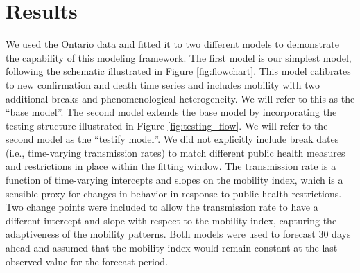 \documentclass[12pt]{article}\usepackage[]{graphicx}\usepackage[]{color}
\begin{document}
\FloatBarrier

\hypertarget{sec:Results}{}
\section{Results}

We used the Ontario data and fitted it to two different models to demonstrate the capability of this modeling framework. The first model is our simplest model, following the schematic illustrated in Figure \ref{fig:flowchart}. This model calibrates to new confirmation and death time series and includes mobility with two additional breaks and phenomenological heterogeneity. We will refer to this as the ``base model''.
The second model extends the base model by incorporating the testing structure illustrated in Figure \ref{fig:testing_flow}. We will refer to the second model as the ``testify model''. 
We did not explicitly include break dates (i.e., time-varying transmission rates) to match different public health measures and restrictions in place within the fitting window. The transmission rate is a function of time-varying intercepts and slopes on the mobility index, which is a sensible proxy for changes in behavior in response to public health restrictions. Two change points were included to allow the transmission rate to have a different intercept and slope with respect to the mobility index, capturing the adaptiveness of the mobility patterns.
Both models were used to forecast 30 days ahead and assumed that the mobility index would remain constant at the last observed value for the forecast period.
 


\end{document}
